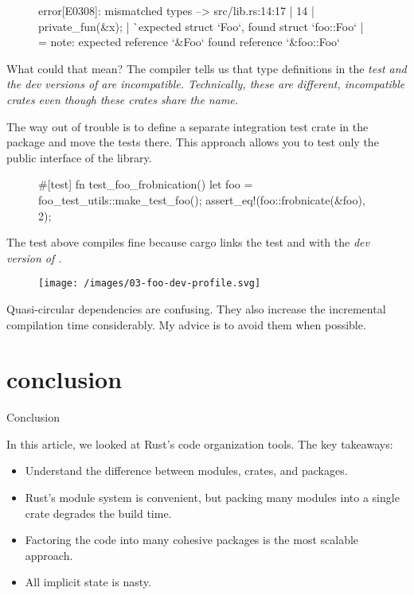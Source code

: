 \documentclass{article}
\begin{document}
\begin{figure}
\begin{code}[bad]
error[E0308]: mismatched types
  --> src/lib.rs:14:17
   |
14 |     private_fun(&x);
   |                 ^^ expected struct `Foo`, found struct `foo::Foo`
   |
   = note: expected reference `&Foo`
              found reference `&foo::Foo`
\end{code}
\end{figure}

What could that mean?
The compiler tells us that type definitions in the \em{test} and the \em{dev} versions of  are incompatible.
Technically, these are different, incompatible crates even though these crates share the name.

The way out of trouble is to define a separate integration test crate in the  package and move the tests there.
This approach allows you to test only the public interface of the  library.

\begin{figure}
\begin{code}[good]
#[test]
fn test_foo_frobnication() {
    let foo = foo_test_utils::make_test_foo();
    assert_eq!(foo::frobnicate(&foo), 2);
}
\end{code}
\end{figure}

The test above compiles fine because cargo links the test and  with the \em{dev} version of .

\begin{figure}[grayscale-diagram]
  \texttt{[image: /images/03-foo-dev-profile.svg]}
\end{figure}

Quasi-circular dependencies are confusing.
They also increase the incremental compilation time considerably.
My advice is to avoid them when possible.

\section{conclusion}{Conclusion}

In this article, we looked at Rust's code organization tools.
The key takeaways:
\begin{itemize}
  \item 
    Understand the difference between modules, crates, and packages.
  \item 
    Rust's module system is convenient, but packing many modules into a single crate degrades the build time.
  \item 
    Factoring the code into many cohesive packages is the most scalable approach.
  \item 
    All implicit state is nasty.
\end{itemize}
\end{document}
